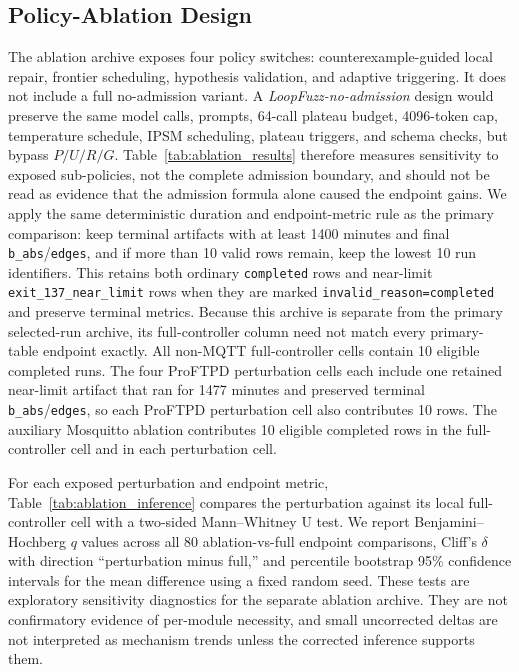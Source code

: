 \documentclass[final,5p,times,number]{elsarticle}
\begin{document}
\subsection{Policy-Ablation Design}
The ablation archive exposes four policy switches: counterexample-guided local repair, frontier scheduling, hypothesis validation, and adaptive triggering. It does not include a full no-admission variant. A \emph{LoopFuzz-no-admission} design would preserve the same model calls, prompts, 64-call plateau budget, 4096-token cap, temperature schedule, IPSM scheduling, plateau triggers, and schema checks, but bypass $P/U/R/G$. Table~\ref{tab:ablation_results} therefore measures sensitivity to exposed sub-policies, not the complete admission boundary, and should not be read as evidence that the admission formula alone caused the endpoint gains. We apply the same deterministic duration and endpoint-metric rule as the primary comparison: keep terminal artifacts with at least 1400 minutes and final \texttt{b\_abs}/\texttt{edges}, and if more than 10 valid rows remain, keep the lowest 10 run identifiers. This retains both ordinary \texttt{completed} rows and near-limit \texttt{exit\_137\_near\_limit} rows when they are marked \texttt{invalid\_reason=completed} and preserve terminal metrics. Because this archive is separate from the primary selected-run archive, its full-controller column need not match every primary-table endpoint exactly. All non-MQTT full-controller cells contain 10 eligible completed runs. The four ProFTPD perturbation cells each include one retained near-limit artifact that ran for 1477 minutes and preserved terminal \texttt{b\_abs}/\texttt{edges}, so each ProFTPD perturbation cell also contributes 10 rows. The auxiliary Mosquitto ablation contributes 10 eligible completed rows in the full-controller cell and in each perturbation cell.

For each exposed perturbation and endpoint metric, Table~\ref{tab:ablation_inference} compares the perturbation against its local full-controller cell with a two-sided Mann--Whitney U test. We report Benjamini--Hochberg $q$ values across all 80 ablation-vs-full endpoint comparisons, Cliff's $\delta$ with direction ``perturbation minus full,'' and percentile bootstrap 95\% confidence intervals for the mean difference using a fixed random seed. These tests are exploratory sensitivity diagnostics for the separate ablation archive. They are not confirmatory evidence of per-module necessity, and small uncorrected deltas are not interpreted as mechanism trends unless the corrected inference supports them.
\end{document}
